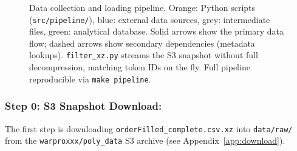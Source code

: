 \documentclass[11pt,a4paper]{article}
\begin{document}
\begin{figure}[H]
\caption{Data collection and loading pipeline. Orange: Python scripts
         (\texttt{src/pipeline/}), blue: external data sources, grey:
         intermediate files, green: analytical database.
         Solid arrows show the primary data flow; dashed arrows show
         secondary dependencies (metadata lookups).
         \texttt{filter\_xz.py} streams the S3 snapshot without full
         decompression, matching token IDs on the fly.
         Full pipeline reproducible via \texttt{make pipeline}.}
\label{fig:pipeline}
\end{figure}


\newpage

\subsubsection*{Step 0: S3 Snapshot Download:}

The first step is downloading \texttt{orderFilled\_complete.csv.xz}
into \texttt{data/raw/} from the \texttt{warproxxx/poly\_data} S3
archive (see Appendix~\ref{app:download}).
\end{document}
